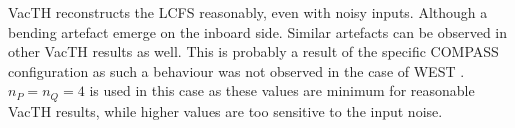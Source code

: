 VacTH reconstructs the LCFS reasonably, even with noisy inputs. Although a bending artefact emerge on the inboard side. Similar artefacts can be observed in other VacTH results as well. This is probably a result of the specific COMPASS configuration as such a behaviour was not observed in the case of WEST \cite{vacthref}. $n_P = n_Q = 4$ is used in this case as these values are minimum for reasonable VacTH results, while higher values are too sensitive to the input noise.


